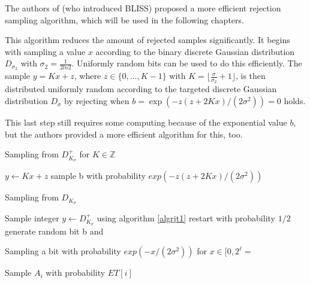 The authors of \cite{bliss} (who introduced \ac{BLISS}) proposed a more efficient rejection sampling algorithm, which will be used in the following chapters.

This algorithm reduces the amount of rejected samples significantly. It begins with sampling a value $x$ according to the binary discrete Gaussian distribution $D_{\sigma 	_{2}}$ with $\sigma _2 = \frac{1}{2 ln 2}$. Uniformly random bits can be used to do this efficiently. The sample $y = Kx + z$, where $z \in \{0,...,K-1\}$ with $K = \lfloor\frac{\sigma}{\sigma _2} + 1\rfloor$, is then distributed uniformly random according to the targeted discrete Gaussian distribution $D_\sigma$ by rejecting when $b = \exp (−z(z + 2Kx)/(2σ^2)) = 0$ holds.

This last step still requires some computing because of the exponential value $b$, but the authors provided a more efficient algorithm for this, too.
 \begin{algorithm}
 	\caption{Sampling from $D^+_{K_{\sigma}}$ for $K\in\mathbb{Z}$}
 	\label{algrjt1}
 	\begin{algorithmic}[1]
 		\State $y \leftarrow Kx + z$
 		\State sample b with probability $exp(-z(z+2Kx)/(2\sigma^2))$
	 		\State
 		\EndIf	
 	\end{algorithmic}
 \end{algorithm}
 \begin{algorithm}
 	\caption{Sampling from $D_{K_{\sigma}}$}
 	\label{algrjt2}
 	\begin{algorithmic}[1]
 		\State Sample integer $y \leftarrow D^+_{K_{\sigma}}$ using algorithm \ref{algrjt1}
	 		\State restart with probability $1/2$
	 	\EndIf
	 	\State generate random bit b and 
 	\end{algorithmic}
 \end{algorithm}
  \begin{algorithm}
  	\caption{Sampling a bit with probability $exp(-x/(2\sigma^2))$ for $x \in [0, 2^\ell=$}
  	\label{algrjt3}
  	\begin{algorithmic}[1]
  	 \Require{$x \in [0,2^\ell)$ an integer in binary form $x = x_{\ell-1}...x_0$. Table $ET$ with precomputed values $ET[i] = exp(-x/(2\sigma^2))$ for $0 \le i \le \ell-1$}
		  	 \State Sample $A_i$ with probability $ET[i]$
		  	  
		  	 \EndIf
		 \EndIf
	 \EndFor
	 \State
  	\end{algorithmic}
  \end{algorithm}

